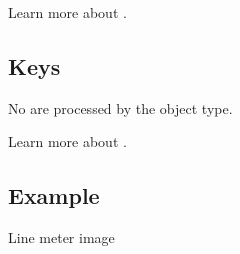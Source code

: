 \documentclass[letterpaper,10pt,english]{sphinxmanual}
\begin{document}
Learn more about {\hyperref[\detokenize{overview/events::doc}]{}}.


\subsection{Keys}
\label{\detokenize{object-types/lmeter:keys}}
No  are processed by the object type.

Learn more about {\hyperref[\detokenize{overview/indev::doc}]{}}.


\subsection{Example}
\label{\detokenize{object-types/lmeter:example}}
Line meter image
\end{document}
